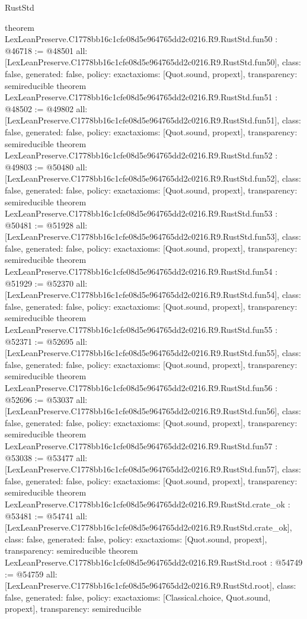 \begin{lexlean}{RustStd}
\begin{coremodule}
{}
theorem LexLeanPreserve.C1778bb16c1cfe08d5e964765dd2c0216.R9.RustStd.fun50 : @46718 := @48501 {
  all: [LexLeanPreserve.C1778bb16c1cfe08d5e964765dd2c0216.R9.RustStd.fun50],
  class: false,
  generated: false,
  policy: exact{axioms: [Quot.sound, propext]},
  transparency: semireducible
}
theorem LexLeanPreserve.C1778bb16c1cfe08d5e964765dd2c0216.R9.RustStd.fun51 : @48502 := @49802 {
  all: [LexLeanPreserve.C1778bb16c1cfe08d5e964765dd2c0216.R9.RustStd.fun51],
  class: false,
  generated: false,
  policy: exact{axioms: [Quot.sound, propext]},
  transparency: semireducible
}
theorem LexLeanPreserve.C1778bb16c1cfe08d5e964765dd2c0216.R9.RustStd.fun52 : @49803 := @50480 {
  all: [LexLeanPreserve.C1778bb16c1cfe08d5e964765dd2c0216.R9.RustStd.fun52],
  class: false,
  generated: false,
  policy: exact{axioms: [Quot.sound, propext]},
  transparency: semireducible
}
theorem LexLeanPreserve.C1778bb16c1cfe08d5e964765dd2c0216.R9.RustStd.fun53 : @50481 := @51928 {
  all: [LexLeanPreserve.C1778bb16c1cfe08d5e964765dd2c0216.R9.RustStd.fun53],
  class: false,
  generated: false,
  policy: exact{axioms: [Quot.sound, propext]},
  transparency: semireducible
}
theorem LexLeanPreserve.C1778bb16c1cfe08d5e964765dd2c0216.R9.RustStd.fun54 : @51929 := @52370 {
  all: [LexLeanPreserve.C1778bb16c1cfe08d5e964765dd2c0216.R9.RustStd.fun54],
  class: false,
  generated: false,
  policy: exact{axioms: [Quot.sound, propext]},
  transparency: semireducible
}
theorem LexLeanPreserve.C1778bb16c1cfe08d5e964765dd2c0216.R9.RustStd.fun55 : @52371 := @52695 {
  all: [LexLeanPreserve.C1778bb16c1cfe08d5e964765dd2c0216.R9.RustStd.fun55],
  class: false,
  generated: false,
  policy: exact{axioms: [Quot.sound, propext]},
  transparency: semireducible
}
theorem LexLeanPreserve.C1778bb16c1cfe08d5e964765dd2c0216.R9.RustStd.fun56 : @52696 := @53037 {
  all: [LexLeanPreserve.C1778bb16c1cfe08d5e964765dd2c0216.R9.RustStd.fun56],
  class: false,
  generated: false,
  policy: exact{axioms: [Quot.sound, propext]},
  transparency: semireducible
}
theorem LexLeanPreserve.C1778bb16c1cfe08d5e964765dd2c0216.R9.RustStd.fun57 : @53038 := @53477 {
  all: [LexLeanPreserve.C1778bb16c1cfe08d5e964765dd2c0216.R9.RustStd.fun57],
  class: false,
  generated: false,
  policy: exact{axioms: [Quot.sound, propext]},
  transparency: semireducible
}
theorem LexLeanPreserve.C1778bb16c1cfe08d5e964765dd2c0216.R9.RustStd.crate_ok : @53481 := @54741 {
  all: [LexLeanPreserve.C1778bb16c1cfe08d5e964765dd2c0216.R9.RustStd.crate_ok],
  class: false,
  generated: false,
  policy: exact{axioms: [Quot.sound, propext]},
  transparency: semireducible
}
theorem LexLeanPreserve.C1778bb16c1cfe08d5e964765dd2c0216.R9.RustStd.root : @54749 := @54759 {
  all: [LexLeanPreserve.C1778bb16c1cfe08d5e964765dd2c0216.R9.RustStd.root],
  class: false,
  generated: false,
  policy: exact{axioms: [Classical.choice, Quot.sound, propext]},
  transparency: semireducible
}


\end{coremodule}
\end{lexlean}

